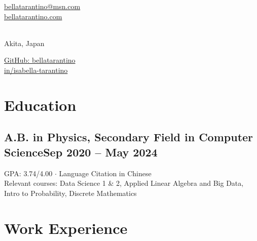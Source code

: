 \documentclass[letter,10pt]{article}
\author{Isabella Tarantino}
\makeatletter
\def\city{Akita, Japan}
\def\email{bellatarantino@msn.com}
\def\website{bellatarantino.com}
\def\github{bellatarantino}
\def\LinkedIn{isabella-tarantino}
\makeatother
\begin{document}
\noindent
	\begin{minipage}[t]{.25\textwidth}
	\raggedright\vspace{0pt}
	\href{mailto:\email}{\email} \\ %
	\href{https://\website}{\website} %
	\end{minipage}%
	\begin{minipage}[t]{.5\textwidth}
	\makeatletter
	\centering\vspace{-2pt}{\huge \@author} \\[.1em]
	{\city}
	\makeatother
	\end{minipage}%
	\begin{minipage}[t]{.25\textwidth}
	\raggedleft\vspace{0pt}
	\href{https://github.com/\github}{GitHub: \github} \\%
	\href{https://www.linkedin.com/in/\LinkedIn}{in/\LinkedIn} %
	\end{minipage}
	\vspace{-4pt}

\section{Education}
\subsection{{A.B. in Physics, Secondary Field in Computer Science}\hfill Sep 2020 -- May 2024}
\vspace*{\bullettop}
GPA: 3.74/4.00 \quad $\cdot$ \quad Language Citation in Chinese \\
Relevant courses: Data Science 1 \& 2, Applied Linear Algebra and Big Data, Intro to Probability, Discrete Mathematics

\section{Work Experience}
\end{document}
